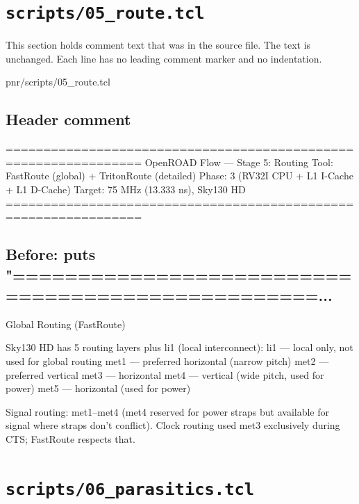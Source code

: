\section{\texttt{scripts/05\_route.tcl}}\label{tm:pd:scripts-05-route-tcl}

This section holds comment text that was in the source file. The text is unchanged. Each line has no leading comment marker and no indentation.

\begin{relocated}{pnr/scripts/05_route.tcl}

\subsection*{Header comment}

\begin{textblock}
================================================================
OpenROAD Flow — Stage 5: Routing
Tool: FastRoute (global) + TritonRoute (detailed)
Phase: 3 (RV32I CPU + L1 I-Cache + L1 D-Cache)
Target: 75 MHz (13.333 ns), Sky130 HD
================================================================
\end{textblock}

\subsection*{Before: puts "==================================================...}

\begin{textblock}
Global Routing (FastRoute)

Sky130 HD has 5 routing layers plus li1 (local interconnect):
  li1  — local only, not used for global routing
  met1 — preferred horizontal (narrow pitch)
  met2 — preferred vertical
  met3 — horizontal
  met4 — vertical (wide pitch, used for power)
  met5 — horizontal (used for power)

Signal routing: met1–met4 (met4 reserved for power straps but available
for signal where straps don't conflict).
Clock routing used met3 exclusively during CTS; FastRoute respects that.
\end{textblock}

\end{relocated}

\section{\texttt{scripts/06\_parasitics.tcl}}\label{tm:pd:scripts-06-parasitics-tcl}

